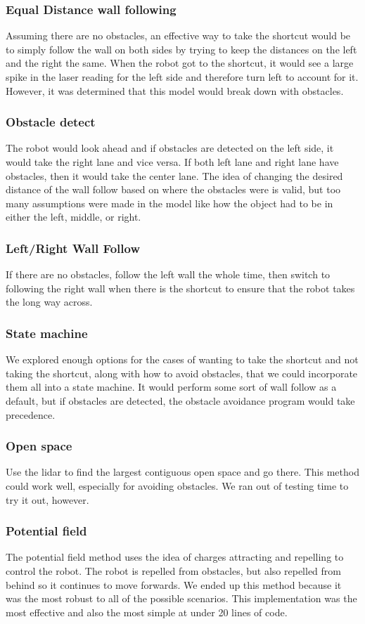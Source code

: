 \documentclass[journal, a4paper]{IEEEtran}
\begin{document}
\subsubsection{Equal Distance wall following}
Assuming there are no obstacles, an effective way to take the shortcut would be to simply follow the wall on both sides by trying to keep the distances on the left and the right the same. When the robot got to the shortcut, it would see a large spike in the laser reading for the left side and therefore turn left to account for it. However, it was determined that this model would break down with obstacles. 
\subsubsection{Obstacle detect}
The robot would look ahead and if obstacles are detected on the left side, it would take the right lane and vice versa. If both left lane and right lane have obstacles, then it would take the center lane. The idea of changing the desired distance of the wall follow based on where the obstacles were is valid, but too many assumptions were made in the model like how the object had to be in either the left, middle, or right. 
\subsubsection{Left/Right Wall Follow}
If there are no obstacles, follow the left wall the whole time, then switch to following the right wall when there is the shortcut to ensure that the robot takes the long way across.
\subsubsection{State machine}
We explored enough options for the cases of wanting to take the shortcut and not taking the shortcut, along with how to avoid obstacles, that we could incorporate them all into a state machine. It would perform some sort of wall follow as a default, but if obstacles are detected, the obstacle avoidance program would take precedence. 
\subsubsection{Open space}
Use the lidar to find the largest contiguous open space and go there. This method could work well, especially for avoiding obstacles. We ran out of testing time to try it out, however. 
\subsubsection{Potential field}
The potential field method uses the idea of charges attracting and repelling to control the robot. The robot is repelled from obstacles, but also repelled from behind so it continues to move forwards. We ended up this method because it was the most robust to all of the possible scenarios. This implementation was the most effective and also the most simple at under 20 lines of code. 
\end{document}
